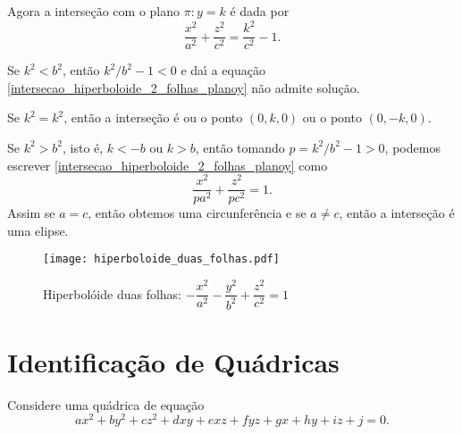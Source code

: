 Agora a interse\c{c}\~ao com o plano $\pi : y = k$ \'e dada por
\begin{equation}\label{intersecao_hiperboloide_2_folhas_planoy}
	\dfrac{x^2}{a^2} + \dfrac{z^2}{c^2} = \dfrac{k^2}{c^2} - 1.	
\end{equation}

Se $k^2 < b^2$, ent\~ao $k^2/b^2 - 1 < 0$ e da{\'\i} a equa\c{c}\~ao \eqref{intersecao_hiperboloide_2_folhas_planoy} n\~ao admite solu\c{c}\~ao.

Se $k^2 = k^2$, ent\~ao a interse\c{c}\~ao \'e ou o ponto $(0,k,0)$ ou o ponto $(0,-k,0)$.

Se $k^2 > b^2$, isto \'e, $k < -b$ ou $k > b$, ent\~ao tomando $p = k^2/b^2 - 1 > 0$, podemos escrever \eqref{intersecao_hiperboloide_2_folhas_planoy} como
\[
	\dfrac{x^2}{pa^2} + \dfrac{z^2}{pc^2} = 1.
\]
Assim se $a = c$, ent\~ao obtemos uma circunfer\^encia e se $a \ne c$, ent\~ao a interse\c{c}\~ao \'e uma elipse.

\begin{figure}[h]
	\centering
	\caption{Hiperbol\'oide duas folhas: $-\dfrac{x^2}{a^2} - \dfrac{y^2}{b^2} + \dfrac{z^2}{c^2} = 1$}
	\texttt{[image: hiperboloide\_duas\_folhas.pdf]}
\end{figure}



	



\section{Identificação de Quádricas} %
\label{sec:identificacao_de_quadricas}

Considere uma quádrica de equa\c{c}\~ao
\begin{equation}\label{equacao_geral_quadrica}
  ax^2 + by^2 + cz^2 + dxy + exz + fyz + gx + hy + iz + j = 0.
\end{equation}

